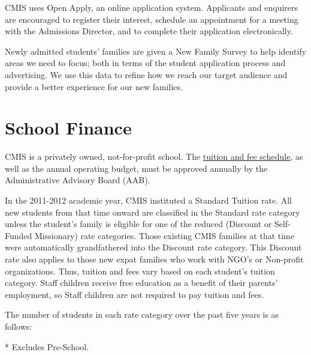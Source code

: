 CMIS uses Open Apply, an online application system.  Applicants and enquirers are encouraged to register their interest, schedule an appointment for a meeting with the Admissions Director, and to complete their application electronically.  

Newly admitted students’ families are given a New Family Survey to help identify areas we need to focus; both in terms of the student application process and advertising. We use this data to refine how we reach our target audience and provide a better experience for our new families.

\section{School Finance}

CMIS is a privately owned, not-for-profit school.  The \href{https://docs.google.com/document/d/1j2Z1tLgRgfX9CH3dzoYtU_GOhPOVWKPl6iFlvWqd6wM/edit?usp=sharing}{tuition and fee schedule}, as well as the annual operating budget, must be approved annually by the Administrative Advisory Board (AAB). 


In the 2011-2012 academic year, CMIS instituted a Standard Tuition rate.  All new students from that time onward are classified in the Standard rate category unless the student’s family is eligible for one of the reduced (Discount or Self-Funded Missionary) rate categories.  Those existing CMIS families at that time were automatically grandfathered into the Discount rate category.  This Discount rate also applies to those new expat families who work with NGO’s or Non-profit organizations.  Thus, tuition and fees vary based on each student’s tuition category.  Staff children receive free education as a benefit of their parents’ employment, so Staff children are not required to pay tuition and fees.  

The number of students in each rate category over the past five years is as follows:

* Excludes Pre-School.  


